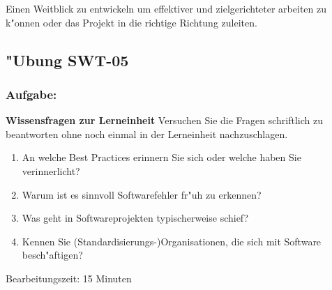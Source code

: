 Einen Weitblick zu entwickeln um effektiver und zielgerichteter arbeiten zu k"onnen oder das Projekt in die richtige Richtung zuleiten.

\newpage
\subsection{"Ubung SWT-05}
\subsubsection*{Aufgabe:}

\begin{framed}
\textbf{Wissensfragen zur Lerneinheit}
\smallbreak
Versuchen Sie die Fragen schriftlich zu beantworten ohne noch einmal in der Lerneinheit nachzuschlagen.
\begin{enumerate}
\item An welche Best Practices erinnern Sie sich oder welche haben Sie verinnerlicht?
\item Warum ist es sinnvoll Softwarefehler fr"uh zu erkennen?
\item Was geht in Softwareprojekten typischerweise schief?
\item Kennen Sie (Standardisierungs-)Organisationen, die sich mit Software besch"aftigen?
\end{enumerate}
\bigbreak
\small Bearbeitungszeit: 15 Minuten
\end{framed}
\bigbreak
\bigbreak

